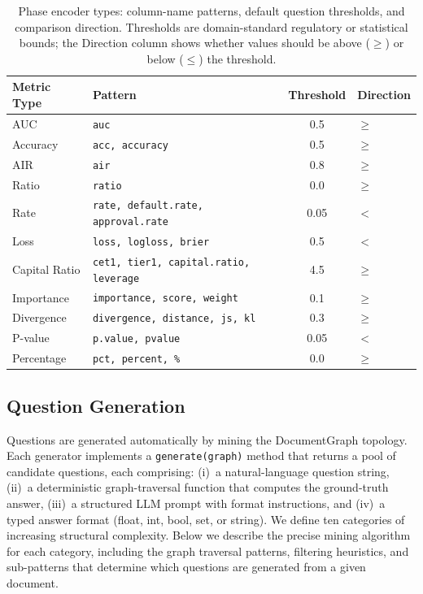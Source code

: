 \documentclass[11pt]{article}
\begin{document}
\begin{table}[t]
\centering
\caption{Phase encoder types: column-name patterns, default question
thresholds, and comparison direction.  Thresholds are domain-standard
regulatory or statistical bounds; the Direction column shows whether
values should be above ($\geq$) or below ($\leq$) the threshold.}
\label{tab:encoders}
\small
\begin{tabular}{llcl}
\toprule
Metric Type & Pattern & Threshold & Direction \\
\midrule
AUC & \texttt{auc} & 0.5 & $\geq$ \\
Accuracy & \texttt{acc, accuracy} & 0.5 & $\geq$ \\
AIR & \texttt{air} & 0.8 & $\geq$ \\
Ratio & \texttt{ratio} & 0.0 & $\geq$ \\
Rate & \texttt{rate, default.rate, approval.rate} & 0.05 & $<$ \\
Loss & \texttt{loss, logloss, brier} & 0.5 & $<$ \\
Capital Ratio & \texttt{cet1, tier1, capital.ratio, leverage} & 4.5 & $\geq$ \\
Importance & \texttt{importance, score, weight} & 0.1 & $\geq$ \\
Divergence & \texttt{divergence, distance, js, kl} & 0.3 & $\geq$ \\
P-value & \texttt{p.value, pvalue} & 0.05 & $<$ \\
Percentage & \texttt{pct, percent, \%} & 0.0 & $\geq$ \\
\bottomrule
\end{tabular}
\end{table}


\subsection{Question Generation}
\label{sec:question_gen}

Questions are generated automatically by mining the DocumentGraph topology.
Each generator implements a \texttt{generate(graph)} method that returns a
pool of candidate questions, each comprising: (i)~a natural-language
question string, (ii)~a deterministic graph-traversal function that
computes the ground-truth answer, (iii)~a structured LLM prompt with
format instructions, and (iv)~a typed answer format (float, int, bool,
set, or string).  We define ten categories of increasing structural
complexity.  Below we describe the precise mining algorithm for each
category, including the graph traversal patterns, filtering heuristics,
and sub-patterns that determine which questions are generated from a
given document.
\end{document}
